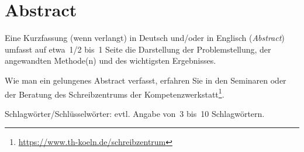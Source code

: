 \chapter*{Abstract}
\label{chap:abstract}
%
Eine Kurzfassung (wenn verlangt) in Deutsch und/oder in Englisch (\emph{Abstract}) umfasst auf etwa~1/2 bis~1 Seite die Darstellung der Problemstellung, der angewandten Methode(n) und des wichtigsten Ergebnisses.
\par
Wie man ein gelungenes Abstract verfasst, erfahren Sie in den Seminaren oder der Beratung des Schreibzentrums der Kompetenzwerkstatt\footnote{\href{https://www.th-koeln.de/schreibzentrum}{https://www.th-koeln.de/schreibzentrum}}.
\par
Schlagwörter/Schlüsselwörter: evtl. Angabe von~3 bis~10 Schlagwörtern.
